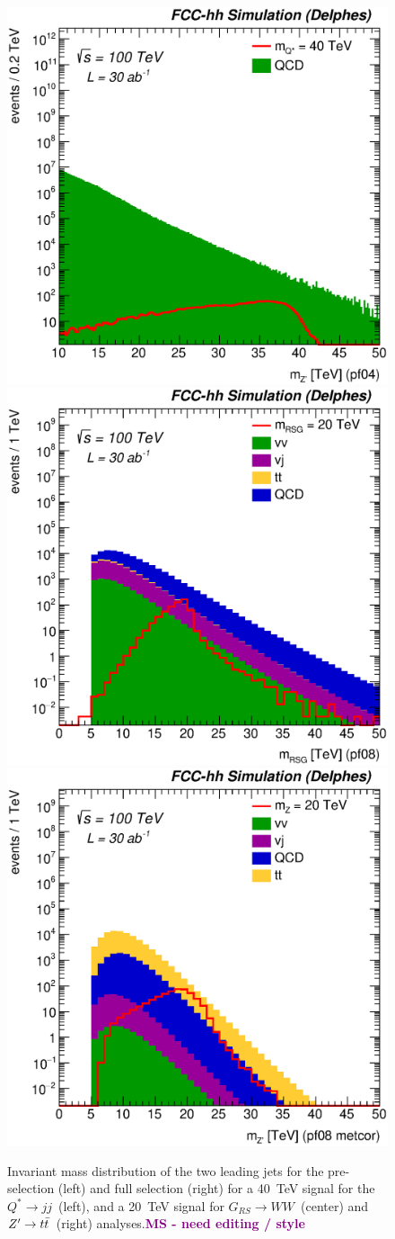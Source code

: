 \documentclass{cernrep}
\newcommand{\MS}[1] {\textbf{\textcolor{purple}{MS - #1}}}
\newcommand*{\zptt}{\ensuremath{Z^{\prime} \rightarrow \ttbar}}
\newcommand*{\qjj}{\ensuremath{Q^{*} \rightarrow jj}}
\newcommand*{\rsg}{\ensuremath{G_{RS} \rightarrow WW}}
\begin{document}
\begin{figure}
  \centering
  \includegraphics[width=0.30\columnwidth]{Fig/Mj1j2_pf04_sel1_nostack_log.eps}
  \includegraphics[width=0.30\columnwidth]{Fig/Mj1j2_pf08_fit_sel4_nostack_log.eps}
  \includegraphics[width=0.30\columnwidth]{Fig/Mj1j2_pf08_MetCorr_fit_sel8_nostack_log.eps}
  \caption{Invariant mass distribution of the two leading jets for the pre-selection (left) and full selection (right) for a 40~TeV signal for the \qjj\ (left), and a 20~TeV signal for \rsg\ (center) and \zptt\ (right) analyses.\MS{need editing / style}}
  \label{figure:hadronicresonances:ttsel08}
\end{figure}
\end{document}
